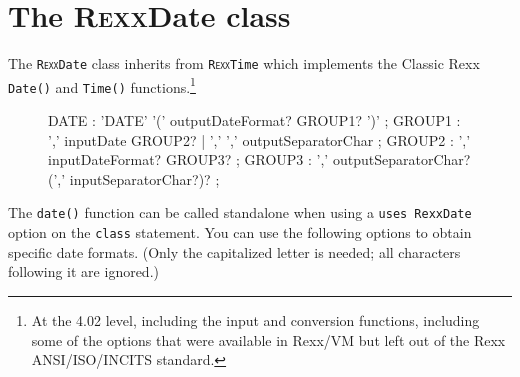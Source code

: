 \section{The R\textsc{exx}Date class}\label{refrexxdate}
 
The \texttt{R\textsc{exx}Date} class inherits from
\texttt{R\textsc{exx}Time} which implements the Classic
Rexx \texttt{Date()} and \texttt{Time()} functions.\footnote{At the
  4.02 level, including the input and conversion functions, including
some of the options that were available in Rexx/VM but left out of the
Rexx ANSI/ISO/INCITS standard.}

\begin{figure}[h]
  \begin{shaded}
\begin{rail}
  DATE : 'DATE' '('   outputDateFormat? GROUP1?  ')'
  ;
  GROUP1 : ','  inputDate GROUP2?
  | ','  ','  outputSeparatorChar
  ;
  GROUP2 : ','  inputDateFormat? GROUP3?
  ;
  GROUP3 : ','  outputSeparatorChar? (',' inputSeparatorChar?)?
  ;
  
\end{rail}
\end{shaded}
\end{figure}

The \texttt{date()} function can be called standalone when using a \texttt{uses RexxDate} option on the \texttt{class} statement. You can use the following options to obtain specific date formats. (Only the capitalized letter is needed; all characters following it are ignored.)
